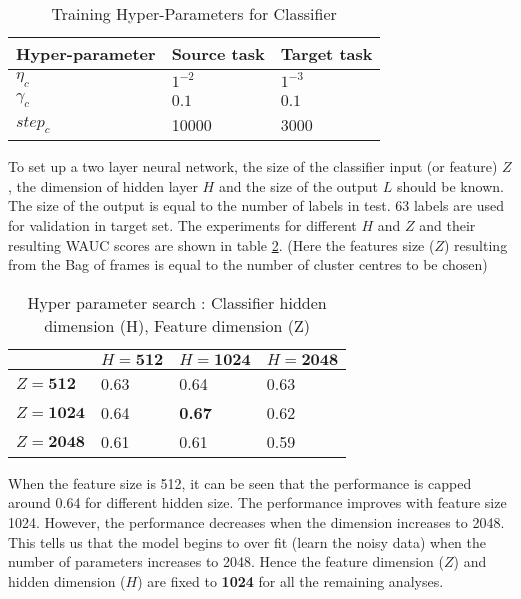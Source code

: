 \begin{table}[H]
\label{tab:a2}
\centering
\begin{tabular}{| p{} | p{} | p{} |}
\hline
\textbf{Hyper-parameter} & \textbf{Source task} & \textbf{Target task}\\
\hline
${\eta}_{c}$ & $1^{-2}$ & $1^{-3}$ \\ 
\hline
${\gamma}_{c}$ & $0.1$ & $ 0.1$\\
\hline
${step}_{c}$ & 10000 & 3000 \\
\hline
\end{tabular}
\caption{Training Hyper-Parameters for Classifier} 
\end{table}
\FloatBarrier

\noindent To set up a two layer neural network, the size of the classifier input (or feature) $Z$, the dimension of hidden layer $H$ and the size of the output $L$ should be known. The size of the output is equal to the number of labels in test. 63 labels are used for validation in target set. The experiments for different $H$ and $Z$ and their resulting WAUC scores are shown in table \ref{tab:a3}. (Here the features size ($Z$) resulting from the Bag of frames is equal to the number of cluster centres to be chosen)
 
\begin{table}[H]
\label{tab:a3}
\centering
\begin{tabular}{| p{} | p{}| p{}| p{} |}
\hline
& $H = \textbf{512}$ & $H = \textbf{1024}$ & $H = \textbf{2048}$\\
\hline
$Z = \textbf{512}$  & 0.63 & 0.64 & 0.63\\
\hline
$Z = \textbf{1024}$ & 0.64 & \textbf{0.67 }& 0.62\\ 
\hline
$Z = \textbf{2048}$ & 0.61 & 0.61 & 0.59\\
\hline
\end{tabular}
\caption{Hyper parameter search : Classifier hidden dimension (H), Feature dimension (Z)} 
\end{table}
\FloatBarrier

\noindent When the feature size is 512, it can be seen that the performance is capped around 0.64 for different hidden size. The performance improves with feature size 1024. However, the performance decreases when the dimension increases to 2048. This tells us that the model begins to over fit (learn the noisy data) when the number of parameters increases to 2048. Hence the feature dimension ($Z$) and hidden dimension ($H$) are fixed to \textbf{1024} for all the remaining analyses. 

